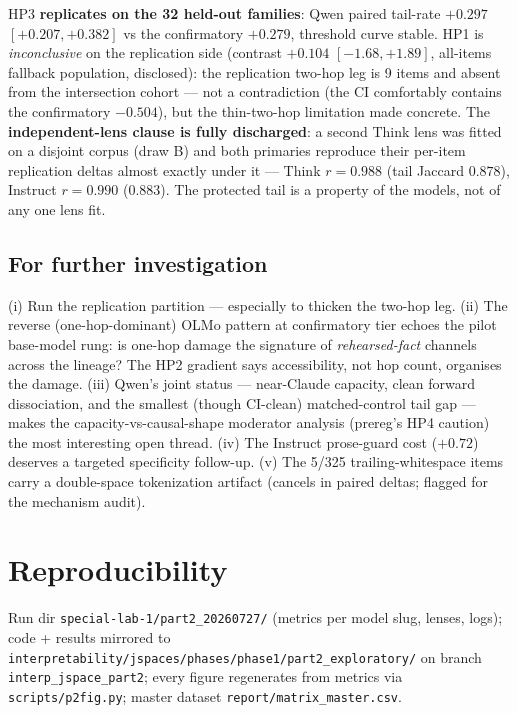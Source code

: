 \documentclass[10pt]{article}
\newcommand{\code}[1]{\texttt{\small #1}}
\begin{document}
HP3 \textbf{replicates on the 32 held-out families}: Qwen paired
tail-rate $+0.297$ $[+0.207, +0.382]$ vs the confirmatory $+0.279$,
threshold curve stable. HP1 is \emph{inconclusive} on the replication
side (contrast $+0.104$ $[-1.68, +1.89]$, all-items fallback population,
disclosed): the replication two-hop leg is 9 items and absent from the
intersection cohort --- not a contradiction (the CI comfortably contains
the confirmatory $-0.504$), but the thin-two-hop limitation made
concrete. The \textbf{independent-lens clause is fully discharged}: a
second Think lens was fitted on a disjoint corpus (draw B) and both
primaries reproduce their per-item replication deltas almost exactly
under it --- Think $r=0.988$ (tail Jaccard $0.878$), Instruct $r=0.990$
($0.883$). The protected tail is a property of the models, not of any
one lens fit.

\subsection{For further investigation}

(i) Run the replication partition --- especially to thicken the two-hop
leg. (ii) The reverse (one-hop-dominant) OLMo pattern at confirmatory
tier echoes the pilot base-model rung: is one-hop damage the signature
of \emph{rehearsed-fact} channels across the lineage? The HP2 gradient
says accessibility, not hop count, organises the damage. (iii) Qwen's
joint status --- near-Claude capacity, clean forward dissociation, and
the smallest (though CI-clean) matched-control tail gap --- makes the
capacity-vs-causal-shape moderator analysis (prereg's HP4 caution) the
most interesting open thread. (iv) The Instruct prose-guard cost
($+0.72$) deserves a targeted specificity follow-up. (v) The 5/325
trailing-whitespace items carry a double-space tokenization artifact
(cancels in paired deltas; flagged for the mechanism audit).

\section*{Reproducibility}

Run dir \code{special-lab-1/part2\_20260727/} (metrics per model slug,
lenses, logs); code + results mirrored to
\code{interpretability/jspaces/phases/phase1/part2_exploratory/} on branch \code{interp\_jspace\_part2};
every figure regenerates from metrics via \code{scripts/p2fig.py}; master
dataset \code{report/matrix\_master.csv}.
\end{document}
